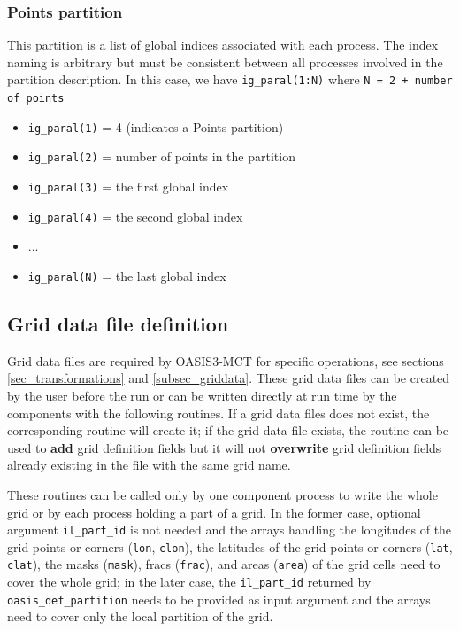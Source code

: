 \subsubsection{Points partition}
\label{subsubsec_pointspart}

This partition is a list of global indices associated with each
process.  The index naming
is arbitrary but must be consistent between all processes involved
in the partition description.  In
this case, we have {\tt ig\_paral(1:N)} where {\tt N = 2 + number of
  points}

\begin{itemize}
\item {\tt ig\_paral(1)} = 4 (indicates a Points partition)
\item {\tt ig\_paral(2)} = number of points in the partition 
\item {\tt ig\_paral(3)} = the first global index
\item {\tt ig\_paral(4)} = the second global index
\item ...
\item {\tt ig\_paral(N)} = the last global index
\end{itemize}

\subsection{Grid data file definition}
\label{subsubsec_griddef}

Grid data files are required by OASIS3-MCT for specific
operations, see sections \ref{sec_transformations} and \ref{subsec_griddata}.
These grid data files can be created by the
user before the run or can be written directly at run time by the components with the following routines.
If a grid data files does not exist, the corresponding routine will create it; if the grid data file exists, the routine can be used to {\bf add} grid definition fields but it will not {\bf overwrite} grid definition fields already existing in the file with the same grid name. 

These routines can be called only by one component process to write the whole grid or by each process holding a part of a grid. In the former case, optional argument {\tt il\_part\_id} is not needed and the arrays handling the longitudes of the grid points or corners ({\tt lon}, {\tt clon}), the latitudes of the grid points or corners ({\tt lat}, {\tt clat}), the masks ({\tt mask}), fracs ({\tt frac}), and areas ({\tt area}) of the grid cells need to cover the whole grid; in the later case, the {\tt il\_part\_id} returned by {\tt oasis\_def\_partition} needs to be provided as input argument and the arrays need to cover only the local partition of the grid.

